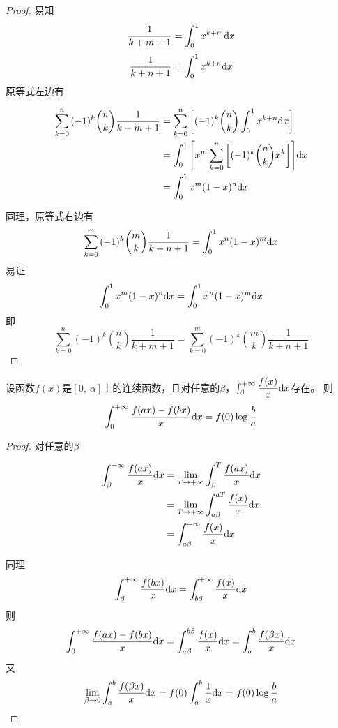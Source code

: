 \begin{proof}

    易知
    $$\dfrac{1}{k + m + 1} = \int_{0}^{1}{x^{k + m}}\mathrm{d} x$$
    $$\dfrac{1}{k + n + 1} = \int_{0}^{1}{x^{k + n}}\mathrm{d} x$$
    原等式左边有
    
    \begin{align*}
        \sum\limits_{k = 0}^{n}{(-1)^k \binom{n}{k}\dfrac{1}{k + m + 1}} & =  \sum\limits_{k = 0}^{n}{\left[(-1)^k \binom{n}{k} \int_{0}^{1}{x^{k + n}}\mathrm{d} x\right]} \\
        & = \int_{0}^{1}{\left[x^m \sum\limits_{k = 0}^{n}{\left[(-1)^k\binom{n}{k} x^k\right]}\right]}\mathrm{d} x \\
        & = \int_{0}^{1}{x^m (1 - x)^n}\mathrm{d} x        
    \end{align*}

    同理，原等式右边有
    $$\sum\limits_{k = 0}^{m}{(-1)^k \binom{m}{k}\dfrac{1}{k + n + 1}} = \int_{0}^{1}{x^n (1 - x)^m}\mathrm{d} x$$
    易证
    $$\int_{0}^{1}{x^m (1 - x)^n}\mathrm{d} x = \int_{0}^{1}{x^n (1 - x)^m}\mathrm{d} x$$
    即
    $$\sum\limits_{k = 0}^{n}{(-1)^k \binom{n}{k}\dfrac{1}{k + m + 1}} = \sum\limits_{k = 0}^{m}{(-1)^k \binom{m}{k}\dfrac{1}{k + n + 1}}$$

\end{proof}

\begin{theorem}[Frullani定理]

    设函数$f(x)$是$[0,\ \alpha]$上的连续函数，且对任意的$\beta$，$\int_{\beta}^{+\infty}{\dfrac{f(x)}{x}}\mathrm{d} x$存在。
    则
    $$\int_{0}^{+\infty}{\dfrac{f(ax) - f(bx)}{x}}\mathrm{d} x = f(0)\log{\dfrac{b}{a}}$$

\end{theorem}

\begin{proof}

    对任意的$\beta$
    
    \begin{align*}
        \int_{\beta}^{+\infty}{\dfrac{f(ax)}{{x}}}\mathrm{d} x & = \lim_{T\to +\infty}{\int_{\beta}^{T}{\dfrac{f(ax)}{{x}}}\mathrm{d} x} \\
        & = \lim_{T\to +\infty}{\int_{a\beta}^{aT}{\dfrac{f(x)}{x}}\mathrm{d} x} \\
        & = \int_{a\beta}^{+\infty}{\dfrac{f(x)}{x}}\mathrm{d} x
    \end{align*}

    同理
    $$\int_{\beta}^{+\infty}{\dfrac{f(bx)}{{x}}}\mathrm{d} x = \int_{b\beta}^{+\infty}{\dfrac{f(x)}{x}}\mathrm{d} x$$
    则
    $$\int_{0}^{+\infty}{\dfrac{f(ax) - f(bx)}{x}}\mathrm{d} x = \int_{a\beta}^{b\beta}{\dfrac{f(x)}{x}}\mathrm{d} x = \int_{a}^{b}{\dfrac{f(\beta x)}{x}}\mathrm{d} x$$
    又
    $$\lim_{\beta \to 0}{\int_{a}^{b}{\dfrac{f(\beta x)}{x}}\mathrm{d} x} = f(0) \int_{a}^{b}{\dfrac{1}{x}}\mathrm{d} x = f(0)\log{\dfrac{b}{a}}$$
    
\end{proof}

